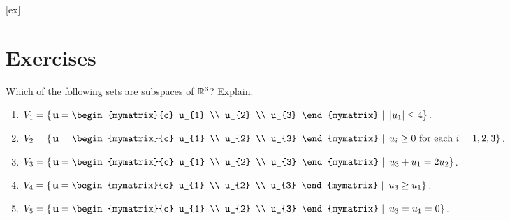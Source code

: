 [ex]
\section*{Exercises}

\begin{enumialphparenastyle}

\begin{ex}
  Which of the following sets are subspaces of $\mathbb{R}^3$? Explain.
  \begin{enumerate}
  \item $V_1=\set{\left.\vect{u}=\begin{mymatrix}{c}
          u_{1} \\ u_{2} \\ u_{3}
        \end{mymatrix}~\right\vert~ \abs{u_{1}} \leq 4}$.
  \item $V_2=\set{\left.\vect{u}=\begin{mymatrix}{c}
          u_{1} \\ u_{2} \\ u_{3}
        \end{mymatrix}~\right\vert~ u_{i}\geq 0\text{ for each }i=1,2,3}$.
  \item $V_3=\set{\left.\vect{u}=\begin{mymatrix}{c}
          u_{1} \\ u_{2} \\ u_{3}
        \end{mymatrix}~\right\vert~ u_{3}+u_{1}=2u_{2}}$.
  \item $V_4=\set{\left.\vect{u}=\begin{mymatrix}{c}
          u_{1} \\ u_{2} \\ u_{3}
        \end{mymatrix}~\right\vert~ u_{3}\geq u_{1}}$.
  \item $V_5=\set{\left.\vect{u}=\begin{mymatrix}{c}
          u_{1} \\ u_{2} \\ u_{3}
        \end{mymatrix}~\right\vert~ u_{3}=u_{1}=0}$.
  \end{enumerate}


\end{ex}
\end{enumialphparenastyle}
